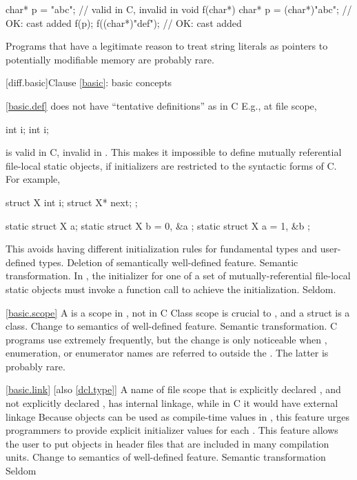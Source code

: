 \begin{codeblock}
char* p = "abc";                // valid in C, invalid in \Cpp
void f(char*) {
  char* p = (char*)"abc";       // OK: cast added
  f(p);
  f((char*)"def");              // OK: cast added
}
\end{codeblock}

\howwide
Programs that have a legitimate reason to treat string literals
as pointers to potentially modifiable memory are probably rare.

[diff.basic]{Clause \ref{basic}: basic concepts}

\ref{basic.def}
\change \Cpp does not have ``tentative definitions'' as in C
E.g., at file scope,

\begin{codeblock}
int i;
int i;
\end{codeblock}

is valid in C, invalid in \Cpp.
This makes it impossible to define
mutually referential file-local static objects, if initializers are
restricted to the syntactic forms of C.
For example,

\begin{codeblock}
struct X { int i; struct X* next; };

static struct X a;
static struct X b = { 0, &a };
static struct X a = { 1, &b };
\end{codeblock}

\rationale
This avoids having different initialization rules for
fundamental types and user-defined types.
\effect
Deletion of semantically well-defined feature.
\difficulty
Semantic transformation.
\rationale
In \Cpp, the initializer for one of a set of
mutually-referential file-local static objects must invoke a function
call to achieve the initialization.
\howwide
Seldom.

\ref{basic.scope}
\change A  is a scope in \Cpp, not in C
\rationale
Class scope is crucial to \Cpp, and a struct is a class.
\effect
Change to semantics of well-defined feature.
\difficulty
Semantic transformation.
\howwide
C programs use  extremely frequently, but the
change is only noticeable when , enumeration, or enumerator
names are referred to outside the .
The latter is probably rare.

\ref{basic.link} [also \ref{dcl.type}] 
\change A name of file scope that is explicitly declared , and not explicitly
declared , has internal linkage, while in C it would have external linkage
\rationale
Because  objects can be used as compile-time values in
\Cpp, this feature urges programmers to provide explicit initializer
values for each .
This feature allows the user to put objects in header files that are included
in many compilation units.
\effect
Change to semantics of well-defined feature.
\difficulty
Semantic transformation
\howwide
Seldom


